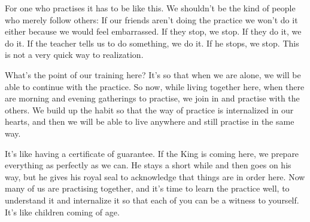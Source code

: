 For one who practises it has to be like this. We shouldn't be the kind of people who merely follow others: If our friends aren't doing the practice we won't do it either because we would feel embarrassed. If they stop, we stop. If they do it, we do it. If the teacher tells us to do something, we do it. If he stops, we stop. This is not a very quick way to realization. 

What's the point of our training here? It's so that when we are alone, we will be able to continue with the practice. So now, while living together here, when there are morning and evening gatherings to practise, we join in and practise with the others. We build up the habit so that the way of practice is internalized in our hearts, and then we will be able to live anywhere and still practise in the same way. 

It's like having a certificate of guarantee. If the King is coming here, we prepare everything as perfectly as we can. He stays a short while and then goes on his way, but he gives his royal seal to acknowledge that things are in order here. Now many of us are practising together, and it's time to learn the practice well, to understand it and internalize it so that each of you can be a witness to yourself. It's like children coming of age.

